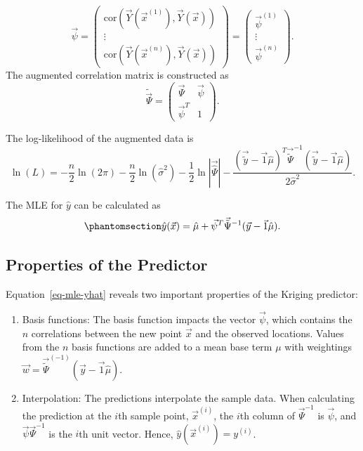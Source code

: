 \documentclass[
  letterpaper,
  DIV=11,
  numbers=noendperiod]{scrreprt}
\providecommand{\tightlist}{%
  \setlength{\itemsep}{0pt}\setlength{\parskip}{0pt}}\usepackage{longtable,booktabs,array}
\begin{document}
\[ \vec{\psi} = \begin{pmatrix}
\text{cor}\left(
\vec{Y}(\vec{x}^{(1)}),
\vec{Y}(\vec{x}) 
\right) \\
\vdots  \\
\text{cor}\left(
\vec{Y}(\vec{x}^{(n)}),
\vec{Y}(\vec{x}) 
\right)
\end{pmatrix}
=
\begin{pmatrix}
\vec{\psi}^{(1)}\\
\vdots\\
\vec{\psi}^{(n)}
\end{pmatrix}.
\] The augmented correlation matrix is constructed as
\[ \tilde{\vec{\Psi}} =
\begin{pmatrix}
\vec{\Psi} & \vec{\psi} \\
\vec{\psi}^T & 1
\end{pmatrix}.
\]

The log-likelihood of the augmented data is \[
\ln(L) = - \frac{n}{2} \ln(2\pi) - \frac{n}{2} \ln(\hat{\sigma}^2) - \frac{1}{2} \ln |\vec{\hat{\Psi}}| -  \frac{(\vec{\tilde{y}} - \vec{1}\hat{\mu})^T \vec{\tilde{\Psi}}^{-1}(\vec{\tilde{y}} - \vec{1}\hat{\mu})}{2 \hat{\sigma}^2}.
\]

The MLE for \(\hat{y}\) can be calculated as
\begin{equation}\phantomsection\label{eq-mle-yhat}{
\hat{y}(\vec{x}) = \hat{\mu} + \vec{\psi}^T \vec{\tilde{\Psi}}^{-1} (\vec{y} - \vec{1}\hat{\mu}).
}\end{equation}

\subsection{Properties of the
Predictor}\label{properties-of-the-predictor}

Equation~\ref{eq-mle-yhat} reveals two important properties of the
Kriging predictor:

\begin{enumerate}
\def\labelenumi{\arabic{enumi}.}
\tightlist
\item
  Basis functions: The basis function impacts the vector \(\vec{\psi}\),
  which contains the \(n\) correlations between the new point
  \(\vec{x}\) and the observed locations. Values from the \(n\) basis
  functions are added to a mean base term \(\mu\) with weightings
  \(\vec{w} = \vec{\tilde{\Psi}}^{(-1)} (\vec{y} - \vec{1}\hat{\mu})\).
\item
  Interpolation: The predictions interpolate the sample data. When
  calculating the prediction at the \(i\)th sample point,
  \(\vec{x}^{(i)}\), the \(i\)th column of \(\vec{\Psi}^{-1}\) is
  \(\vec{\psi}\), and \(\vec{\psi}  \vec{\Psi}^{-1}\) is the \(i\)th
  unit vector. Hence, \(\hat{y}(\vec{x}^{(i)}) = y^{(i)}\).
\end{enumerate}
\end{document}
